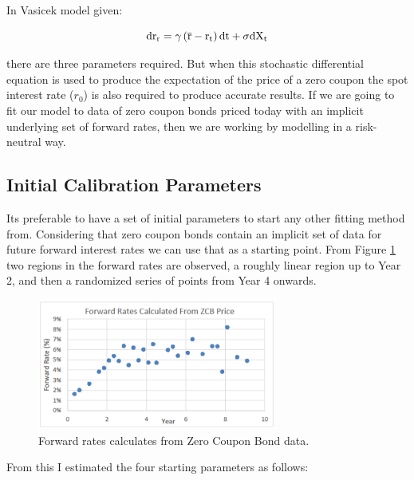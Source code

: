 \documentclass[10pt,a4paper]{article}
\theoremstyle{definition}
\theoremstyle{plain}
\theoremstyle{definition}
\theoremstyle{plain}
\newcommand{\der}{\rm{d}}
\begin{document}
In Vasicek model given:

\begin{equation}
\der r_r = \gamma \left( \overline{r} - r_t \right) \der t + \sigma \der X_t
\end{equation}

there are three parameters required. But when this stochastic differential equation is used to produce the expectation of the price of a zero coupon the spot interest rate ($r_0$) is also required to produce accurate results. If we are going to fit our model to data of zero coupon bonds priced today with an implicit underlying set of forward rates, then we are working by modelling in a risk-neutral way.

\subsection{Initial Calibration Parameters}

Its preferable to have a set of initial parameters to start any other fitting method from. Considering that zero coupon bonds contain an implicit set of data for future forward interest rates we can use that as a starting point. From Figure \ref{fig:ForwardRates} two regions in the forward rates are observed, a roughly linear region up to Year 2, and then a randomized series of points from Year 4 onwards. 

\begin{figure}[h]
	\centering
	\includegraphics[width=0.7\textwidth]{ForwardRates.png}
	\caption{Forward rates calculates from Zero Coupon Bond data.}
	\label{fig:ForwardRates}
\end{figure}

From this I estimated the four starting parameters as follows:
\end{document}
